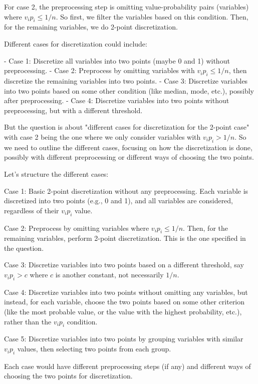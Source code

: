 For case 2, the preprocessing step is omitting value-probability pairs (variables) where \( v_i p_i \leq 1/n \). So first, we filter the variables based on this condition. Then, for the remaining variables, we do 2-point discretization.

Different cases for discretization could include:

- Case 1: Discretize all variables into two points (maybe 0 and 1) without preprocessing.
- Case 2: Preprocess by omitting variables with \( v_i p_i \leq 1/n \), then discretize the remaining variables into two points.
- Case 3: Discretize variables into two points based on some other condition (like median, mode, etc.), possibly after preprocessing.
- Case 4: Discretize variables into two points without preprocessing, but with a different threshold.

But the question is about "different cases for discretization for the 2-point case" with case 2 being the one where we only consider variables with \( v_i p_i > 1/n \). So we need to outline the different cases, focusing on how the discretization is done, possibly with different preprocessing or different ways of choosing the two points.

Let's structure the different cases:

Case 1: Basic 2-point discretization without any preprocessing. Each variable is discretized into two points (e.g., 0 and 1), and all variables are considered, regardless of their \( v_i p_i \) value.

Case 2: Preprocess by omitting variables where \( v_i p_i \leq 1/n \). Then, for the remaining variables, perform 2-point discretization. This is the one specified in the question.

Case 3: Discretize variables into two points based on a different threshold, say \( v_i p_i > c \) where \( c \) is another constant, not necessarily \( 1/n \).

Case 4: Discretize variables into two points without omitting any variables, but instead, for each variable, choose the two points based on some other criterion (like the most probable value, or the value with the highest probability, etc.), rather than the \( v_i p_i \) condition.

Case 5: Discretize variables into two points by grouping variables with similar \( v_i p_i \) values, then selecting two points from each group.

Each case would have different preprocessing steps (if any) and different ways of choosing the two points for discretization.

